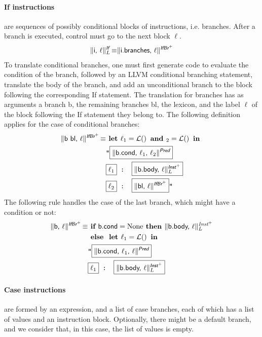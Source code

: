 \documentclass{llncs}
\newcommand{\trad}[2]{\ensuremath{\lVert \textsf{#1} \rVert^{\textit{#2}}}}
\DeclareMathOperator{\isdef}{\equiv}
\DeclareMathOperator{\lbl}{\mathcal{L}()}
\newcommand{\llvm}[1]{\texttt{#1}}
\newcommand{\B}[1]{\textsf{#1}}
\newcommand{\ListOf}[1]{$\mbox{#1}^+$}
\newcommand{\IF}[0]{\textbf{ if }}
\newcommand{\ELSE}[0]{\textbf{ else }}
\newcommand{\THEN}[0]{\textbf{ then }}
\newcommand{\LET}[0]{\textbf{ let }}
\newcommand{\IN}[0]{\textbf{ in }}
\newcommand{\AND}[1]{\textbf{ and }}
\newcommand{\PH}[1]{\framebox{$#1$}}
\begin{document}
\paragraph{If instructions} are sequences of possibly conditional blocks of
instructions, i.e. branches. After a branch is executed, control must go
to the next block $\ell$.
\begin{align*}
  \trad{i, $\ell$}{\B{If}}_L \isdef \trad{i.branches, $\ell$}{\ListOf{\B{IfBr}}}
\end{align*}
To translate conditional branches, one must first generate code to evaluate the
condition of the branch, followed by an LLVM conditional branching statement,
translate the body of the branch, and add an unconditional branch to the block
following the corresponding \B{If} statement.  The translation for branches has
as arguments a branch \B{b}, the remaining branches \B{bl}, the lexicon, and the
label $\ell$ of the block following the \B{If} statement they belong to. The
following definition applies for the case of conditional branches:
\begin{align*}
\begin{split}
  \trad{\B{b bl}, $\ell$}{\ListOf{\B{IfBr}}} \isdef & \LET \ell_1 = \lbl \AND \ell_2 = \lbl \IN \\
  & \llvm{"\PH{\trad{b.cond, $\ell_1$, $\ell_2$}{\B{Pred}}} } \\
  & \llvm{\PH{\ell_1} : \PH{\trad{b.body, $\ell$}{\ListOf{\B{Inst}}}_L}} \\
  & \llvm{\PH{\ell_2} : \PH{\trad{bl, $\ell$}{\ListOf{\B{IfBr}}}}"} \\
\end{split}
\end{align*}
The following rule handles the case of the last branch, which might have a condition or not:
\begin{align*}
\begin{split}
  \trad{\B{b}, $\ell$}{\ListOf{\B{IfBr}}} \isdef & \IF \B{b.cond} = \text{None} \THEN
  \trad{b.body, $\ell$}{\ListOf{Inst}}_L\\
  & \ELSE \LET \ell_1 = \lbl \IN \\
  & \llvm{"\PH{\trad{b.cond, $\ell_1$, $\ell$}{\B{Pred}}} } \\
  & \llvm{\PH{\ell_1} : \PH{\trad{b.body, $\ell$}{\ListOf{\B{Inst}}}_L}}
\end{split}
\end{align*}

\paragraph{Case instructions} are formed by an expression, and a list of case
branches, each of which has a list of values and an instruction block.
Optionally, there might be a default branch, and we consider that, in this case,
the list of values is empty.
\end{document}
